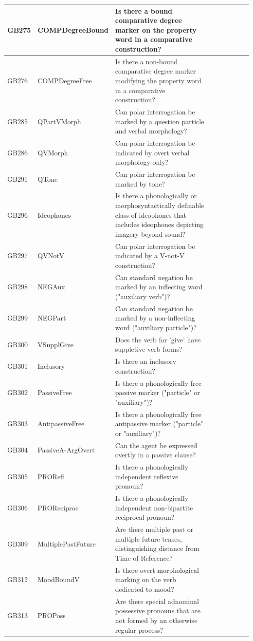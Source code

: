 \documentclass[draft,10pt]{article} %
\begin{document}
\begin{landscape}
\begin{longtable}{| l | p{4cm}| p{12cm}|p{2cm}|p{2cm}|p{2cm}|p{2cm}|p{2cm}|p{2cm}|}
GB275 & COMPDegreeBound&Is there a bound comparative degree marker on the property word in a comparative construction?\\ \hline
GB276 & COMPDegreeFree&Is there a non-bound comparative degree marker modifying the property word in a comparative construction?\\ \hline
GB285 & QPartVMorph&Can polar interrogation be marked by a question particle and verbal morphology?\\ \hline
GB286 & QVMorph&Can polar interrogation be indicated by overt verbal morphology only?\\ \hline
GB291 & QTone&Can polar interrogation be marked by tone?\\ \hline
GB296 & Ideophones&Is there a phonologically or morphosyntactically definable class of ideophones that includes ideophones depicting imagery beyond sound?\\ \hline
GB297 & QVNotV&Can polar interrogation be indicated by a V-not-V construction?\\ \hline
GB298 & NEGAux&Can standard negation be marked by an inflecting word ("auxiliary verb")?\\ \hline
GB299 & NEGPart&Can standard negation be marked by a non-inflecting word ("auxiliary particle")?\\ \hline
GB300 & VSupplGive&Does the verb for 'give' have suppletive verb forms?\\ \hline
GB301 & Inclusory&Is there an inclusory construction?\\ \hline
GB302 & PassiveFree&Is there a phonologically free passive marker ("particle" or "auxiliary")?\\ \hline
GB303 & AntipassiveFree&Is there a phonologically free antipassive marker ("particle" or "auxiliary")?\\ \hline
GB304 & PassiveA-ArgOvert&Can the agent be expressed overtly in a passive clause?\\ \hline
GB305 & PRORefl&Is there a phonologically independent reflexive pronoun?\\ \hline
GB306 & PROReciproc&Is there a phonologically independent non-bipartite reciprocal pronoun?\\ \hline
GB309 & MultiplePastFuture&Are there multiple past or multiple future tenses, distinguishing distance from Time of Reference?\\ \hline
GB312 & MoodBoundV&Is there overt morphological marking on the verb dedicated to mood?\\ \hline
GB313 & PROPoss&Are there special adnominal possessive pronouns that are not formed by an otherwise regular process?\\ \hline

\end{longtable}
\end{landscape}
\end{document}
